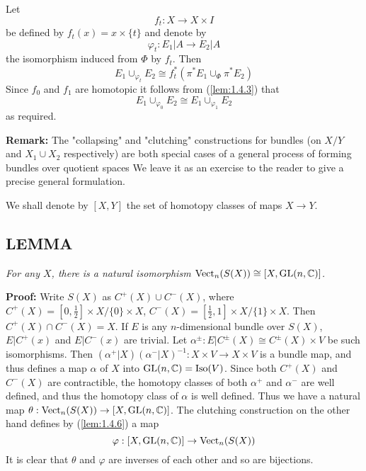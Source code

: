 Let 
\begin{equation*}
    f_t: X \to X \times I
\end{equation*}
be defined by $f_t(x) = x \times \{t\}$ and denote by
\begin{equation*}
    \varphi_t: E_1 \vert A \to E_2 \vert A
\end{equation*}
the isomorphism induced from $\Phi$ by $f_t$. Then
\begin{equation*}
    E_1 \cup_{\varphi_t} E_2 \cong f_t^*(\pi^* E_1 \cup_\Phi \pi^* E_2)
\end{equation*}
Since $f_0$ and $f_1$ are homotopic it follows from (\ref{lem:1.4.3}) that
\begin{equation*}
    E_1 \cup_{\varphi_0} E_2 \cong E_1 \cup_{\varphi_1} E_2
\end{equation*}
as required. \par 

\textbf{Remark:} The "collapsing" and "clutching" constructions for bundles (on $X/Y$ and $X_1 \cup X_2$ respectively) are both special cases of a general process of forming bundles over quotient spaces We leave it as an exercise to the reader to give a precise general formulation. \par 

We shall denote by $[X, Y]$ the set of homotopy classes of maps $X \to Y$. \par 

\subsection{LEMMA}\label{lem:1.4.9} \textit{For any $X$, there is a natural isomorphism $\operatorname{Vect}_n(S(X)) \cong [X, \operatorname{GL}(n, \mathbb{C})]$.} \par 

\textbf{Proof:} Write $S(X)$ as $C^+(X) \cup C^-(X)$, where $C^+(X) = [0, \frac{1}{2}] \times X/\{0\} \times X$, $C^-(X) = [\frac{1}{2}, 1] \times X/\{1\} \times X$. Then $C^+(X) \cap C^-(X) = X$. If $E$ is any $n$-dimensional bundle over $S(X)$, $E \vert C^+(x)$ and $E \vert C^-(x)$ are trivial. Let $\alpha^\pm: E \vert C^\pm(X) \cong C^\pm(X) \times V$ be such isomorphisms. Then $(\alpha^+ \vert X)(\alpha^- \vert X)^{-1}: X \times V \to X \times V$ is a bundle map, and thus defines a map $\alpha$ of $X$ into $\operatorname{GL}(n, \mathbb{C}) = \operatorname{Iso}(V)$. Since both $C^+(X)$ and $C^-(X)$ are contractible, the homotopy classes of both $\alpha^+$ and $\alpha^-$ are well defined, and thus the homotopy class of $\alpha$ is well defined. Thus we have a natural map $\theta: \operatorname{Vect}_n(S(X)) \to [X, \operatorname{GL}(n, \mathbb{C})]$. The clutching construction on the other hand defines by (\ref{lem:1.4.6}) a map
\begin{equation*}
    \varphi: [X, \operatorname{GL}(n, \mathbb{C})] \to \operatorname{Vect}_n(S(X))
\end{equation*}
It is clear that $\theta$ and $\varphi$ are inverses of each other and so are bijections. \par 

